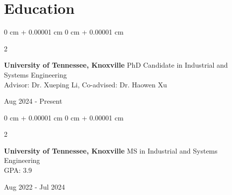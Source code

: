 \documentclass[10pt, letterpaper]{article}
\newenvironment{highlightsforbulletentries}{
    \begin{itemize}[
        topsep=0.10 cm,
        parsep=0.10 cm,
        partopsep=0pt,
        itemsep=0pt,
        leftmargin=10pt
    ]
}{
    \end{itemize}
} %
\newenvironment{onecolentry}{
    \begin{adjustwidth}{
        0 cm + 0.00001 cm
    }{
        0 cm + 0.00001 cm
    }
}{
    \end{adjustwidth}
} %
\newenvironment{twocolentry}[2][]{
    \onecolentry
    \def\secondColumn{#2}
    \setcolumnwidth{\fill, 4.5 cm}
    \begin{paracol}{2}
}{
    \switchcolumn \raggedleft \secondColumn
    \end{paracol}
    \endonecolentry
} %
\begin{document}



    










\section*{Education}
\begin{twocolentry}{Aug 2024 - Present}
    \small \textbf{University of Tennessee, Knoxville} \textbar PhD Candidate in Industrial and Systems Engineering \\
    Advisor: Dr. Xueping Li, Co-advised: Dr. Haowen Xu 
\end{twocolentry}

\begin{twocolentry}{Aug 2022 - Jul 2024}
    \small \textbf{University of Tennessee, Knoxville} \textbar MS in Industrial and Systems Engineering\\
    GPA: 3.9
\end{twocolentry}
\end{document}
